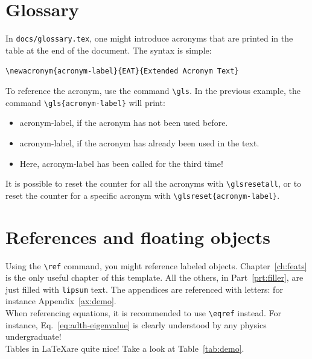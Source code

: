 \section{Glossary}

In \texttt{docs/glossary.tex}, one might introduce acronyms that are printed in the table at the end of the document. The syntax is simple:

\begin{center}
    \texttt{\textbackslash newacronym\{acronym-label\}\{EAT\}\{Extended Acronym Text\}}
\end{center}

To reference the acronym, use the command \texttt{\textbackslash gls}. 
In the previous example, the command \texttt{\textbackslash gls\{acronym-label\}} will print:
\begin{itemize}
    \item \gls{acronym-label}, if the acronym has not been used before.
    \item \gls{acronym-label}, if the acronym has already been used in the text.
    \item Here, \gls{acronym-label} has been called for the third time!
\end{itemize}

It is possible to reset the counter for all the acronyms with \texttt{\textbackslash glsresetall}, or to reset the counter for a specific acronym with \texttt{\textbackslash glsreset\{acronym-label\}}.




\section{References and floating objects}

Using the \texttt{\textbackslash ref} command, you might reference labeled objects.
Chapter~\ref{ch:feats} is the only useful chapter of this template.
All the others, in Part~\ref{prt:filler}, are just filled with \texttt{lipsum} text.
The appendices are referenced with letters: for instance Appendix~\ref{ax:demo}.\\

When referencing equations, it is recommended to use \texttt{\textbackslash eqref} instead. 
For instance, Eq.~\eqref{eq:adth-eigenvalue} is clearly understood by any physics undergraduate!\\

Tables in \LaTeX are quite nice! Take a look at Table~\ref{tab:demo}.\\

